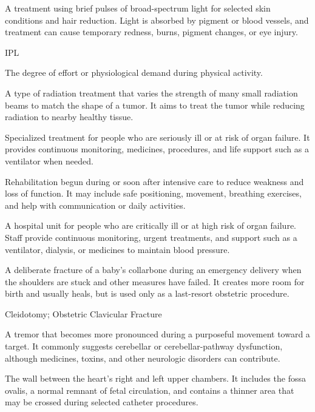 A treatment using brief pulses of broad-spectrum light for selected skin conditions and hair reduction. Light is absorbed by pigment or blood vessels, and treatment can cause temporary redness, burns, pigment changes, or eye injury.

\synonyms
IPL

 The degree of effort or physiological demand during physical activity.

 A type of radiation treatment that varies the strength of many small radiation beams to match the shape of a tumor. It aims to treat the tumor while reducing radiation to nearby healthy tissue.

 Specialized treatment for people who are seriously ill or at risk of organ failure. It provides continuous monitoring, medicines, procedures, and life support such as a ventilator when needed.

 Rehabilitation begun during or soon after intensive care to reduce weakness and loss of function. It may include safe positioning, movement, breathing exercises, and help with communication or daily activities.

 A hospital unit for people who are critically ill or at high risk of organ failure. Staff provide continuous monitoring, urgent treatments, and support such as a ventilator, dialysis, or medicines to maintain blood pressure.

 A deliberate fracture of a baby's collarbone during an emergency delivery when the shoulders are stuck and other measures have failed. It creates more room for birth and usually heals, but is used only as a last-resort obstetric procedure.

\synonyms
Cleidotomy; Obstetric Clavicular Fracture

 A tremor that becomes more pronounced during a purposeful movement toward a target. It commonly suggests cerebellar or cerebellar-pathway dysfunction, although medicines, toxins, and other neurologic disorders can contribute.

 The wall between the heart's right and left upper chambers. It includes the fossa ovalis, a normal remnant of fetal circulation, and contains a thinner area that may be crossed during selected catheter procedures.

